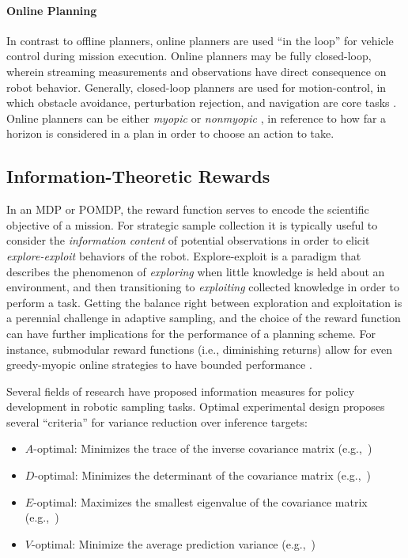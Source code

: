 \paragraph{Online Planning}
In contrast to offline planners, online planners are used ``in the loop'' for vehicle control during mission execution.
Online planners may be fully closed-loop, wherein streaming measurements and observations have direct consequence on robot behavior.
Generally, closed-loop planners are used for motion-control, in which obstacle avoidance, perturbation rejection, and navigation are core tasks \autocite{majumdar2013robust,esposito2002method}.
Online planners can be either \emph{myopic} \autocite{vergassola2007infotaxis,edwards2005moth} or \emph{nonmyopic} \autocite{Arora2017,singh2009nonmyopic,Lim2016,meliou2007nonmyopic,kurniawati2008sarsop,somani2013despot,sunberg2018online,browne2012survey}, in reference to how far a horizon is considered in a plan in order to choose an action to take.

\subsection{Information-Theoretic Rewards}
In an MDP or POMDP, the reward function serves to encode the scientific objective of a mission. For strategic sample collection it is typically useful to consider the \emph{information content} of potential observations in order to elicit \emph{explore-exploit} behaviors of the robot. Explore-exploit is a paradigm that describes the phenomenon of \emph{exploring} when little knowledge is held about an environment, and then transitioning to \emph{exploiting} collected knowledge in order to perform a task. Getting the balance right between exploration and exploitation is a perennial challenge in adaptive sampling, and the choice of the reward function can have further implications for the performance of a planning scheme. For instance, submodular reward functions (i.e., diminishing returns) allow for even greedy-myopic online strategies to have bounded performance \autocite{horel2016notes}. 

Several fields of research have proposed information measures for policy development in robotic sampling tasks. Optimal experimental design\autocite{fedorov2013theory} proposes several ``criteria'' for variance reduction over inference targets:

\begin{itemize}
	\item $A$-optimal: Minimizes the trace of the inverse covariance matrix (e.g.,~\cite{sim2005global,kollar2008trajectory,carrillo2015monotonicity})
	\item $D$-optimal: Minimizes the determinant of the covariance matrix (e.g.,~\cite{kollar2008trajectory,carrillo2015monotonicity,joshi2008sensor,joshi2008sensor})
	\item $E$-optimal: Maximizes the smallest eigenvalue of the covariance matrix (e.g.,~\cite{carrillo2015monotonicity})
	\item $V$-optimal: Minimize the average prediction variance (e.g.,~\cite{cohn1994neural})
\end{itemize}

